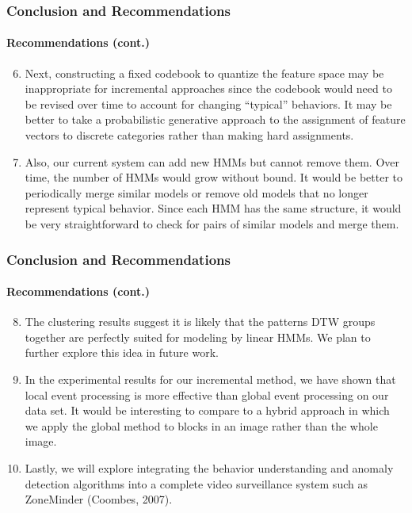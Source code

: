 
\begin{frame}
    \frametitle{Conclusion and Recommendations}
    \framesubtitle{Recommendations (cont.)}
        
    \begin{enumerate}
        \setcounter{enumi}{5}
        \item Next, constructing a fixed codebook to quantize the 
            feature space 
            may be inappropriate for incremental approaches since 
            the codebook would 
            need to be revised over time to account for changing 
            ``typical'' behaviors. 
            It may be better to take a probabilistic generative approach 
            to the assignment of 
            feature vectors to discrete categories rather than making 
            hard assignments.
        \item Also, our current system can add new HMMs but cannot remove them. 
            Over time, the number of
            HMMs would grow without bound. It would be better to periodically merge 
            similar models or remove
            old models that no longer represent typical behavior. Since each HMM has 
            the same structure, it
            would be very straightforward to check for pairs of similar models 
            and merge them.
    \end{enumerate}

\end{frame}


\begin{frame}
    \frametitle{Conclusion and Recommendations}
    \framesubtitle{Recommendations (cont.)}
        
    \begin{enumerate}
        \setcounter{enumi}{7}
            \item The clustering results suggest it is likely that the patterns DTW 
                groups together 
                are perfectly suited
                for modeling by linear HMMs. We plan to further explore this idea 
                in future work.
            \item In the experimental results for our incremental method, we have 
                shown that local 
                event processing is more effective than global event processing 
                on our data set. 
                It would be interesting to compare to a hybrid approach in which we 
                apply the global 
                method to blocks in an image rather than the whole image.
            \item Lastly, we will explore integrating the behavior understanding and 
                anomaly detection algorithms 
                into a complete video surveillance system such as 
                ZoneMinder (Coombes, 2007).
    \end{enumerate}

\end{frame}

